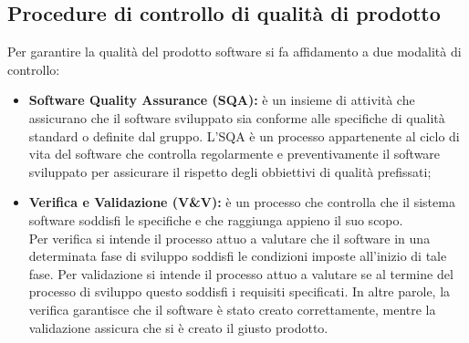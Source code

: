 	\subsection{Procedure di controllo di qualità di prodotto}
	Per garantire la qualità del prodotto software si fa affidamento a due modalità di controllo:
		\begin{itemize}
			\item \textbf{Software Quality Assurance (SQA):} è un insieme di attività che assicurano che il software sviluppato sia conforme alle specifiche di qualità standard o definite dal gruppo. L'SQA è un processo appartenente al ciclo di vita del software che controlla regolarmente e preventivamente il software sviluppato per assicurare il rispetto degli obbiettivi di qualità prefissati;
			\item \textbf{Verifica e Validazione\gloss{} (V\&V):} è un processo che controlla che il sistema software soddisfi le specifiche e che raggiunga appieno il suo scopo.\\
			Per verifica si intende il processo attuo a valutare che il software in una determinata fase di sviluppo soddisfi le condizioni imposte all'inizio di tale fase. Per validazione\gloss{} si intende il processo attuo a valutare se al termine del processo di sviluppo questo soddisfi i requisiti specificati. In altre parole, la verifica garantisce che il software è stato creato correttamente, mentre la validazione assicura che si è creato il giusto prodotto.
		\end{itemize}
	
	\pagebreak